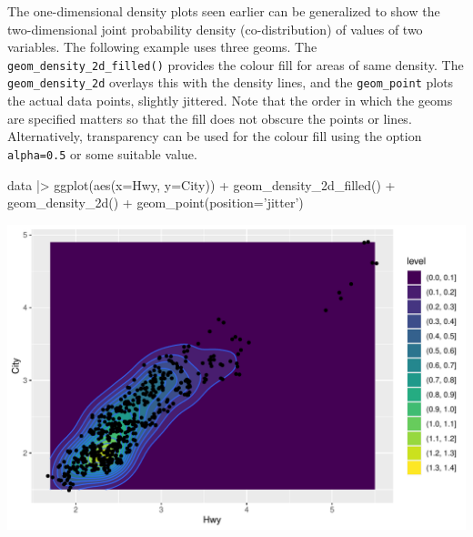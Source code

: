 


The one-dimensional density plots seen earlier can be generalized to show the two-dimensional joint probability density (co-distribution) of values of two variables. The following example uses three geoms. The \texttt{geom\_density\_2d\_filled()} provides the colour fill for areas of same density. The \texttt{geom\_density\_2d} overlays this with the density lines, and the \texttt{geom\_point} plots the actual data points, slightly jittered. Note that the order in which the geoms are specified matters so that the fill does not obscure the points or lines. Alternatively, transparency can be used for the colour fill using the option \texttt{alpha=0.5} or some suitable value.

\begin{samepage}
\begin{Rcode}
data |>
  ggplot(aes(x=Hwy, y=City)) + 
    geom_density_2d_filled() + 
    geom_density_2d() +
    geom_point(position='jitter')
\end{Rcode}
\end{samepage}

\begin{center}
  \includegraphics[width=.8\textwidth]{fuel.density2d.pdf}
\end{center}

